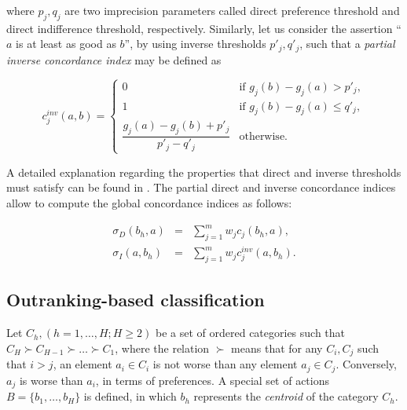 \documentclass[]{elsarticle}
\theoremstyle{definition}
\begin{document}
\noindent
where $p_j,q_j$ are two imprecision parameters called direct preference threshold and  direct indifference threshold, respectively.  Similarly,  let us consider the assertion ``$a$ is at least as good as $b$'', by using inverse thresholds $p'_j,q'_j$, such that a \emph{partial inverse concordance index} may be defined as 

{\fontsize{7}{7}
\begin{equation}
c^{inv}_j(a,b) =
\begin{cases}
	0							& \mbox{if  $g_j(b)-g_j(a) > p'_j$}, \\
	1							& \mbox{if  $g_j(b)-g_j(a) \leq q'_j$},   \\
	\dfrac{g_j(a)-g_j(b)+p'_j}{p'_j-q'_j} 	& \mbox{otherwise}. 				     	      
 \end{cases} 
 \label{invcredibility}
 \end{equation} 
}


\noindent
A detailed explanation regarding the properties that direct and inverse thresholds must satisfy can be found in \cite{roy2012}.  The partial direct and inverse concordance indices allow to compute the global concordance indices as follows:

\begin{eqnarray}
\sigma_D(b_h,a) 	&=& \sum_{j=1}^{m} w_j c_j(b_h,a),\label{generalsigmaDG}\\
\sigma_I(a,b_h) 	&=& \sum_{j=1}^{m} w_j c^{inv}_j(a,b_h). \label{generalsigmaIG}
\end{eqnarray} 


\subsection{Outranking-based classification}\label{outrankingclass}

Let $C_h, (h=1,\ldots,H; H\geq 2)$ be a set of ordered categories such that $C_H \succ C_{H-1}\succ \ldots \succ C_1$, where  the relation $\succ$ means that for any $C_i, C_ j $ such that $i>j$, an element $a_i \in C_i$ is not worse than any element $a_j \in C_j$. Conversely, $a_j$ is worse than $a_i$, in terms of preferences.   A special set of actions $B=\{b_1,\ldots, b_H\}$ is defined, in which $b_h$ represents the \emph{centroid} of the category $C_h$. 



\def \q {1}
\def \p {2}
\def \qq {1.5}
\def \pp {3}
\def \xmina{-3}
\def \xmaxa{.5}
\def \xminb{-.5}
\def \xmaxb{4}
\def \ymax{1}
\def \xb{2*\p}
\end{document}
